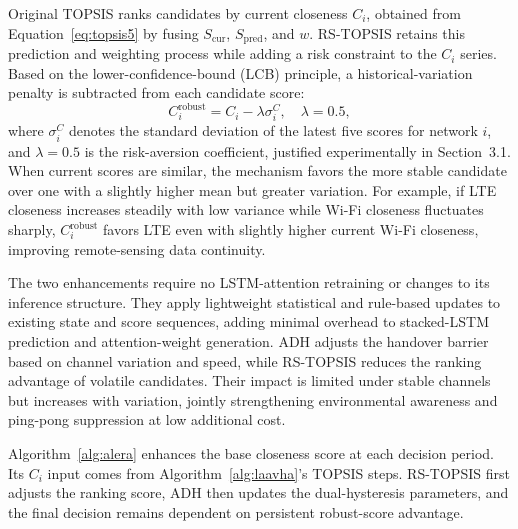\documentclass[10pt,a4paper]{article}
\begin{document}
Original TOPSIS ranks candidates by current closeness $C_i$, obtained from Equation~\eqref{eq:topsis5} by fusing $S_{\mathrm{cur}}$, $S_{\mathrm{pred}}$, and $w$. RS-TOPSIS retains this prediction and weighting process while adding a risk constraint to the $C_i$ series. Based on the lower-confidence-bound (LCB) principle, a historical-variation penalty is subtracted from each candidate score:
\begin{equation}
C_i^{\mathrm{robust}}=C_i-\lambda\sigma_i^C,\quad \lambda=0.5,
\label{eq:rstopsis}
\end{equation}
where $\sigma_i^C$ denotes the standard deviation of the latest five scores for network $i$, and $\lambda=0.5$ is the risk-aversion coefficient, justified experimentally in Section~3.1. When current scores are similar, the mechanism favors the more stable candidate over one with a slightly higher mean but greater variation. For example, if LTE closeness increases steadily with low variance while Wi-Fi closeness fluctuates sharply, $C_i^{\mathrm{robust}}$ favors LTE even with slightly higher current Wi-Fi closeness, improving remote-sensing data continuity.

The two enhancements require no LSTM-attention retraining or changes to its inference structure. They apply lightweight statistical and rule-based updates to existing state and score sequences, adding minimal overhead to stacked-LSTM prediction and attention-weight generation. ADH adjusts the handover barrier based on channel variation and speed, while RS-TOPSIS reduces the ranking advantage of volatile candidates. Their impact is limited under stable channels but increases with variation, jointly strengthening environmental awareness and ping-pong suppression at low additional cost.

Algorithm~\ref{alg:alera} enhances the base closeness score at each decision period. Its $C_i$ input comes from Algorithm~\ref{alg:laavha}'s TOPSIS steps. RS-TOPSIS first adjusts the ranking score, ADH then updates the dual-hysteresis parameters, and the final decision remains dependent on persistent robust-score advantage.
\end{document}
